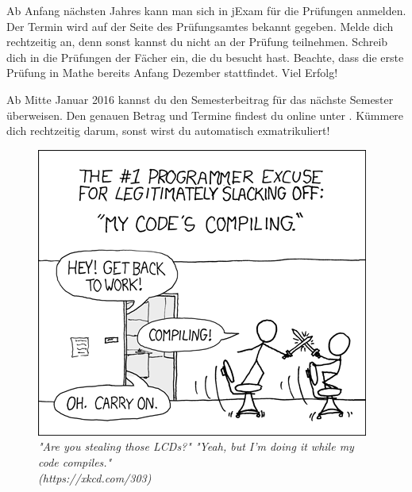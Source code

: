 \begin{itemize}[leftmargin=*]
\newpage


Ab Anfang nächsten Jahres kann man sich in jExam für die Prüfungen anmelden. Der
Termin wird auf der Seite des Prüfungsamtes bekannt gegeben. Melde dich
rechtzeitig an, denn sonst kannst du nicht an der Prüfung teilnehmen. Schreib
dich in die Prüfungen der Fächer ein, die du besucht hast. Beachte, dass die
erste Prüfung in Mathe bereits Anfang Dezember stattfindet. Viel Erfolg!

Ab Mitte Januar 2016 kannst du den Semesterbeitrag für das nächste Semester
überweisen. Den genauen Betrag und Termine findest du online unter
. Kümmere dich rechtzeitig darum,
sonst wirst du automatisch exmatrikuliert!

\end{itemize}

\vfill

\begin{figure}[h!]
\centering
\includegraphics[scale=.7]{img/xkcd/compiling.png}
\caption*{{\small \textit{"Are you stealing those LCDs?" "Yeah, but I'm doing it while my code compiles."\\\hspace*{1mm}\hfill(https://xkcd.com/303)}}}
\end{figure}

